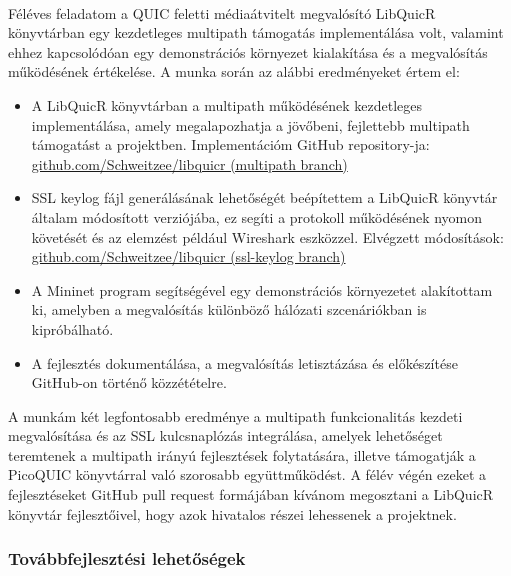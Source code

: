 \documentclass[a4paper,oneside]{article}
\begin{document}
\paragraph{}

Féléves feladatom a QUIC feletti médiaátvitelt megvalósító LibQuicR könyvtárban egy kezdetleges multipath támogatás implementálása volt, valamint ehhez kapcsolódóan egy demonstrációs környezet kialakítása és a megvalósítás működésének értékelése. A munka során az alábbi eredményeket értem el:

\begin{itemize}
\item A LibQuicR könyvtárban a multipath működésének kezdetleges implementálása, 
amely megalapozhatja a jövőbeni, fejlettebb multipath támogatást a projektben. Implementációm GitHub repository-ja: 
\href{https://github.com/Schweitzee/libquicr/tree/multipath}{github.com/Schweitzee/libquicr (multipath branch)}
\item SSL keylog fájl generálásának lehetőségét beépítettem a LibQuicR könyvtár 
általam módosított verziójába, ez segíti a protokoll működésének nyomon követését 
és az elemzést például Wireshark eszközzel. Elvégzett módosítások: 
\href{https://github.com/Schweitzee/libquicr/tree/ssl-keylog}{github.com/Schweitzee/libquicr (ssl-keylog branch)}
\item A Mininet program segítségével egy demonstrációs környezetet alakítottam ki, 
amelyben a megvalósítás különböző hálózati szcenáriókban is kipróbálható.
\item A fejlesztés dokumentálása, a megvalósítás letisztázása és előkészítése 
GitHub-on történő közzétételre.
\end{itemize}

A munkám két legfontosabb eredménye a multipath funkcionalitás 
kezdeti megvalósítása és az SSL kulcsnaplózás integrálása, amelyek 
lehetőséget teremtenek a multipath irányú fejlesztések folytatására, 
illetve támogatják a PicoQUIC könyvtárral való szorosabb együttműködést. 
A félév végén ezeket a fejlesztéseket GitHub pull request formájában kívánom 
megosztani a LibQuicR könyvtár fejlesztőivel, hogy azok hivatalos részei lehessenek a projektnek.

\subsubsection{Továbbfejlesztési lehetőségek}
\end{document}
